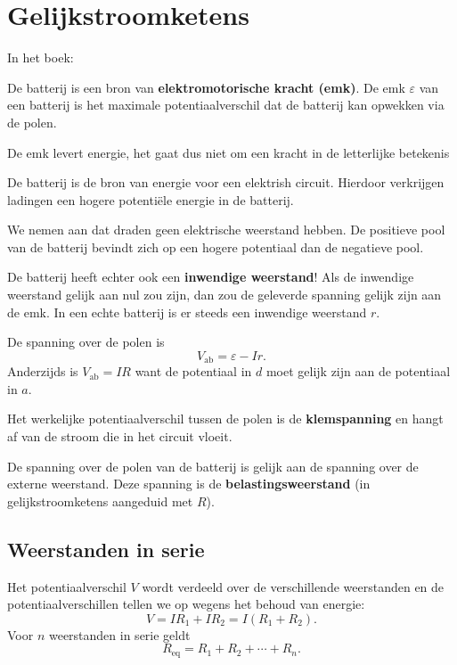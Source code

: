 \setcounter{chapter}{5}
\chapter{Gelijkstroomketens}
In het boek:~\cite[H26]{giancoli}


De batterij is een bron van \textbf{elektromotorische kracht (emk)}.
De emk $\varepsilon$ van een batterij is het maximale potentiaalverschil dat de batterij kan opwekken via de polen.

\begin{opmerking}{}
    De emk levert energie, het gaat dus niet om een kracht in de letterlijke betekenis
\end{opmerking}

De batterij is de bron van energie voor een elektrish circuit.
Hierdoor verkrijgen ladingen een hogere potentiële energie in de batterij.

We nemen aan dat draden geen elektrische weerstand hebben.
De positieve pool van de batterij bevindt zich op een hogere potentiaal dan de negatieve pool.
\begin{opmerking}{}
    De batterij heeft echter ook een \textbf{inwendige weerstand}!
    Als de inwendige weerstand gelijk aan nul zou zijn, dan zou de geleverde spanning gelijk zijn aan de emk.
    In een echte batterij is er steeds een inwendige weerstand $r$.
\end{opmerking}

De spanning over de polen is
\[
    V_{\text{ab}} = \varepsilon - Ir.
\]
Anderzijds is $V_{\text{ab}} = IR$ want de potentiaal in $d$ moet gelijk zijn aan de potentiaal in $a$.

Het werkelijke potentiaalverschil tussen de polen is de \textbf{klemspanning} en hangt af van de stroom die in het circuit vloeit.

De spanning over de polen van de batterij is gelijk aan de spanning over de externe weerstand.
Deze spanning is de \textbf{belastingsweerstand} (in gelijkstroomketens aangeduid met $R$).


\section{Weerstanden in serie}

Het potentiaalverschil $V$ wordt verdeeld over de verschillende weerstanden en de potentiaalverschillen tellen we op wegens het behoud van energie:
\[
    V = IR_1 + IR_2 = I(R_1 + R_2).
\]
Voor $n$ weerstanden in serie geldt
\[
    R_{\text{eq}} = R_1 + R_2 + \cdots + R_n.
\]


